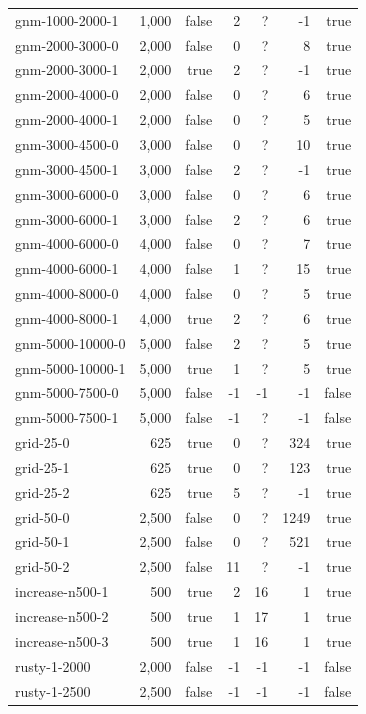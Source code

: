 \begin{tabular}{lrrrrrr}
  gnm-1000-2000-1 & 1,000 & false & 2 & ? & -1 & true \\
  gnm-2000-3000-0 & 2,000 & false & 0 & ? & 8 & true \\
  gnm-2000-3000-1 & 2,000 & true & 2 & ? & -1 & true \\
  gnm-2000-4000-0 & 2,000 & false & 0 & ? & 6 & true \\
  gnm-2000-4000-1 & 2,000 & false & 0 & ? & 5 & true \\
  gnm-3000-4500-0 & 3,000 & false & 0 & ? & 10 & true \\
  gnm-3000-4500-1 & 3,000 & false & 2 & ? & -1 & true \\
  gnm-3000-6000-0 & 3,000 & false & 0 & ? & 6 & true \\
  gnm-3000-6000-1 & 3,000 & false & 2 & ? & 6 & true \\
  gnm-4000-6000-0 & 4,000 & false & 0 & ? & 7 & true \\
  gnm-4000-6000-1 & 4,000 & false & 1 & ? & 15 & true \\
  gnm-4000-8000-0 & 4,000 & false & 0 & ? & 5 & true \\
  gnm-4000-8000-1 & 4,000 & true & 2 & ? & 6 & true \\
  gnm-5000-10000-0 & 5,000 & false & 2 & ? & 5 & true \\
  gnm-5000-10000-1 & 5,000 & true & 1 & ? & 5 & true \\
  gnm-5000-7500-0 & 5,000 & false & -1 & -1 & -1 & false \\
  gnm-5000-7500-1 & 5,000 & false & -1 & ? & -1 & false \\
  grid-25-0 & 625 & true & 0 & ? & 324 & true \\
  grid-25-1 & 625 & true & 0 & ? & 123 & true \\
  grid-25-2 & 625 & true & 5 & ? & -1 & true \\
  grid-50-0 & 2,500 & false & 0 & ? & 1249 & true \\
  grid-50-1 & 2,500 & false & 0 & ? & 521 & true \\
  grid-50-2 & 2,500 & false & 11 & ? & -1 & true \\
  increase-n500-1 & 500 & true & 2 & 16 & 1 & true \\
  increase-n500-2 & 500 & true & 1 & 17 & 1 & true \\
  increase-n500-3 & 500 & true & 1 & 16 & 1 & true \\
  rusty-1-2000 & 2,000 & false & -1 & -1 & -1 & false \\
  rusty-1-2500 & 2,500 & false & -1 & -1 & -1 & false \\

\end{tabular}
